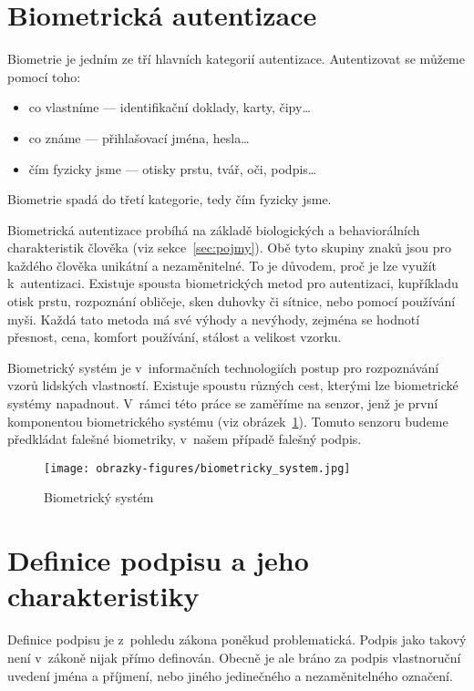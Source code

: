 \section{Biometrická autentizace}
Biometrie je jedním ze tří hlavních kategorií autentizace.
Autentizovat se můžeme pomocí toho:

\begin{itemize}
  \item co vlastníme --- identifikační doklady, karty, čipy\ldots   %
  \item co známe --- přihlašovací jména, hesla\ldots                %
  \item čím fyzicky jsme --- otisky prstu, tvář, oči, podpis\ldots~\cite{RakRoman2008}%
\end{itemize}                                                   %
Biometrie spadá do třetí kategorie, tedy čím fyzicky jsme. 
\newline

Biometrická autentizace probíhá na základě biologických a behaviorálních charakteristik člověka (viz sekce~\ref{sec:pojmy}). 
Obě tyto skupiny znaků jsou pro každého člověka unikátní a nezaměnitelné. To je důvodem, proč je lze využít k~autentizaci.
Existuje spousta biometrických metod pro autentizaci, kupříkladu otisk prstu, rozpoznání obličeje, sken duhovky či sítnice, nebo pomocí používání myši. 
Každá tato metoda má své výhody a nevýhody, zejména se hodnotí přesnost, cena, komfort používání, stálost a velikost vzorku.

Biometrický systém je v~informačních technologiích postup pro rozpoznávání vzorů lidských vlastností.       %
Existuje spoustu různých cest, kterými lze biometrické systémy napadnout.                                   %
V~rámci této práce se zaměříme na senzor, jenž je první komponentou biometrického systému (viz obrázek~\ref{fig:biometricky_system}). %
Tomuto senzoru budeme předkládat falešné biometriky, v~našem případě falešný podpis.~\cite{DrahanskýMartin2011}%

\begin{figure}[H]
  \centering
  \texttt{[image: obrazky-figures/biometricky\_system.jpg]}
  \caption{Biometrický systém~\cite{DrahanskýMartin2011}}
  \label{fig:biometricky_system}
\end{figure}

\section{Definice podpisu a jeho charakteristiky}
Definice podpisu je z~pohledu zákona poněkud problematická. 
Podpis jako takový není v~zákoně nijak přímo definován. 
Obecně je ale bráno za podpis vlastnoruční uvedení jména a příjmení, nebo jiného jedinečného a nezaměnitelného označení.~\cite{Fulsoft2023} %

